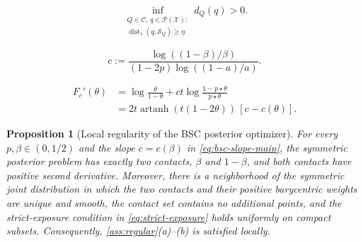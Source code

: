 \documentclass[10pt,a4paper]{amsart}
\newtheorem{proposition}{Proposition}
\newcommand{\Pcal}{\mathcal P}
\newcommand{\Scal}{\mathcal S}
\newcommand{\X}{\mathcal X}
\newcommand{\dist}{\operatorname{dist}}
\begin{document}
\begin{equation}
\inf_{\substack{Q\in\mathcal C,\ q\in\Pcal(\X):\\
\dist_1(q,\Scal_Q)\ge\eta}}d_Q(q)>0.
\label{eq:strict-exposure}
\end{equation}

\begin{equation}
c:=\frac{\log((1-\beta)/\beta)}{(1-2p)\log((1-a)/a)}.
\label{eq:bsc-slope-main}
\end{equation}

\begin{align}
F_c'(\theta)
&=\log\frac{\theta}{1-\theta}
+ct\log\frac{1-p\star\theta}{p\star\theta}\\
&=2t\operatorname{artanh}(t(1-2\theta))\,[c-c(\theta)].
\label{eq:bsc-Fprime-app}
\end{align}

\begin{proposition}[Local regularity of the BSC posterior optimizer]
\label{prop:bsc-regularity}
For every $p,\beta\in(0,1/2)$ and the slope $c=c(\beta)$ in \eqref{eq:bsc-slope-main}, the symmetric posterior problem has exactly two contacts, $\beta$ and $1-\beta$, and both contacts have positive second derivative.  Moreover, there is a neighborhood of the symmetric joint distribution in which the two contacts and their positive barycentric weights are unique and smooth, the contact set contains no additional points, and the strict-exposure condition in \eqref{eq:strict-exposure} holds uniformly on compact subsets.  Consequently, \cref{ass:regular}(a)--(b) is satisfied locally.
\end{proposition}
\end{document}
